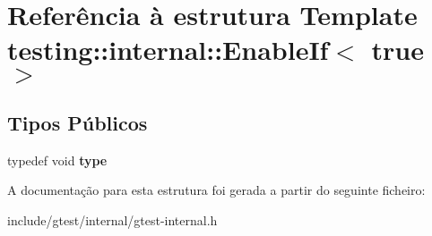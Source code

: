 \hypertarget{structtesting_1_1internal_1_1EnableIf_3_01true_01_4}{\section{Referência à estrutura Template testing\-:\-:internal\-:\-:Enable\-If$<$ true $>$}
\label{structtesting_1_1internal_1_1EnableIf_3_01true_01_4}
}
\subsection*{Tipos Públicos}
\begin{DoxyCompactItemize}
\item 
\hypertarget{structtesting_1_1internal_1_1EnableIf_3_01true_01_4_a9398d803f1fdd99ff41823746f6299ff}{typedef void {\bfseries type}}\label{structtesting_1_1internal_1_1EnableIf_3_01true_01_4_a9398d803f1fdd99ff41823746f6299ff}

\end{DoxyCompactItemize}


A documentação para esta estrutura foi gerada a partir do seguinte ficheiro\-:\begin{DoxyCompactItemize}
\item 
include/gtest/internal/gtest-\/internal.\-h\end{DoxyCompactItemize}
